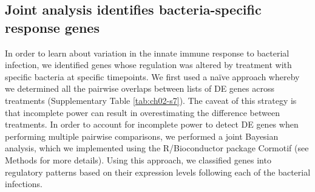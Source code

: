 \subsection{Joint analysis identifies bacteria-specific response
genes}\label{joint-analysis-identifies-bacteria-specific-response-genes}

In order to learn about variation in the innate immune response to
bacterial infection, we identified genes whose regulation was altered by
treatment with specific bacteria at specific timepoints. We first used a
naïve approach whereby we determined all the pairwise overlaps between
lists of DE genes across treatments (Supplementary Table \ref{tab:ch02-s7}). The caveat
of this strategy is that incomplete power can result in overestimating
the difference between treatments. In order to account for incomplete
power to detect DE genes when performing multiple pairwise comparisons,
we performed a joint Bayesian analysis, which we implemented using the
R/Bioconductor package Cormotif \citep{Wei2015} (see Methods for more
details). Using this approach, we classified genes into regulatory
patterns based on their expression levels following each of the
bacterial infections.

